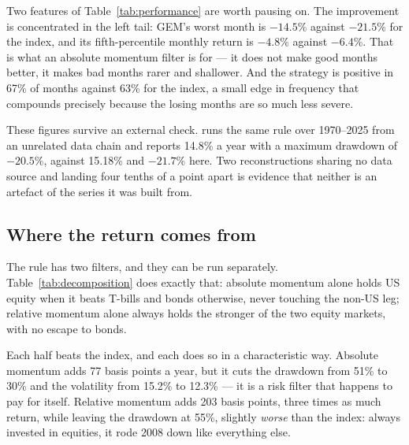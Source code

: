 \documentclass[11pt,a4paper]{article}
\begin{document}
\begin{table}[H]
  \centering
  \caption{Performance, January 1971 to July 2026.}
  \label{tab:performance}
  
\end{table}

Two features of Table~\ref{tab:performance} are worth pausing on. The
improvement is concentrated in the left tail: GEM's worst month is $-14.5$\%
against $-21.5$\% for the index, and its fifth-percentile monthly return is
$-4.8$\% against $-6.4$\%. That is what an absolute momentum filter is for --- it
does not make good months better, it makes bad months rarer and shallower. And
the strategy is positive in 67\% of months against 63\% for the index, a small
edge in frequency that compounds precisely because the losing months are so
much less severe.

These figures survive an external check.
\citet{link2025} runs the same rule over 1970--2025 from an unrelated data
chain and reports 14.8\% a year with a maximum drawdown of $-20.5$\%, against
15.18\% and $-21.7$\% here. Two reconstructions sharing no data source and
landing four tenths of a point apart is evidence that neither is an artefact of
the series it was built from.

\subsection{Where the return comes from}

The rule has two filters, and they can be run separately.
Table~\ref{tab:decomposition} does exactly that: absolute momentum alone holds
US equity when it beats T-bills and bonds otherwise, never touching the non-US
leg; relative momentum alone always holds the stronger of the two equity
markets, with no escape to bonds.

\begin{table}[H]
  \centering
  \caption{Decomposition: what each momentum filter contributes.}
  \label{tab:decomposition}
  
\end{table}

Each half beats the index, and each does so in a characteristic way. Absolute
momentum adds 77 basis points a year, but it cuts the drawdown from 51\% to
30\% and the volatility from 15.2\% to 12.3\% --- it is a risk filter that
happens to pay for itself. Relative momentum adds 203 basis points, three times
as much return, while leaving the drawdown at 55\%, slightly \emph{worse} than
the index: always invested in equities, it rode 2008 down like everything else.
\end{document}
